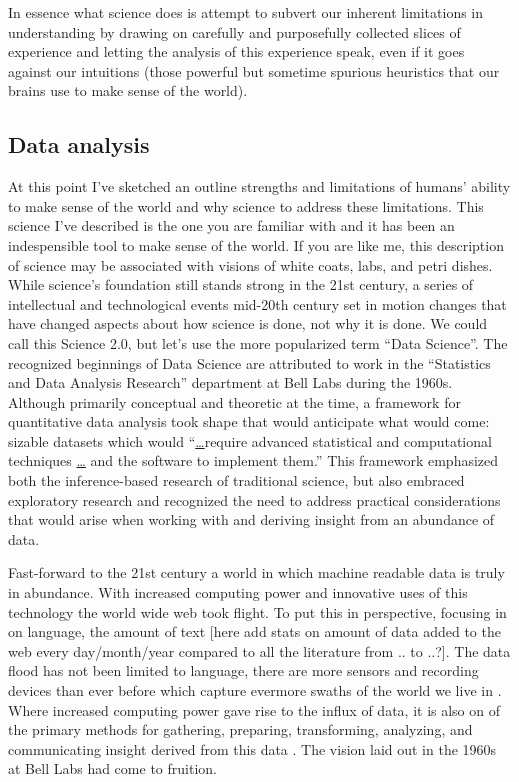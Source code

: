 \documentclass[
]{article}
\begin{document}
In essence what science does is attempt to subvert our inherent limitations in understanding by drawing on carefully and purposefully collected slices of experience and letting the analysis of this experience speak, even if it goes against our intuitions (those powerful but sometime spurious heuristics that our brains use to make sense of the world).

\hypertarget{data-analysis}{%
\subsection{Data analysis}\label{data-analysis}}

At this point I've sketched an outline strengths and limitations of humans' ability to make sense of the world and why science to address these limitations. This science I've described is the one you are familiar with and it has been an indespensible tool to make sense of the world. If you are like me, this description of science may be associated with visions of white coats, labs, and petri dishes. While science's foundation still stands strong in the 21st century, a series of intellectual and technological events mid-20th century set in motion changes that have changed aspects about how science is done, not why it is done. We could call this Science 2.0, but let's use the more popularized term ``Data Science''. The recognized beginnings of Data Science are attributed to work in the ``Statistics and Data Analysis Research'' department at Bell Labs during the 1960s. Although primarily conceptual and theoretic at the time, a framework for quantitative data analysis took shape that would anticipate what would come: sizable datasets which would ``\protect\hyperlink{section-6}{\ldots{}}require advanced statistical and computational techniques \protect\hyperlink{section-6}{\ldots{}} and the software to implement them.'' \citep{Chambers2020} This framework emphasized both the inference-based research of traditional science, but also embraced exploratory research and recognized the need to address practical considerations that would arise when working with and deriving insight from an abundance of data.

Fast-forward to the 21st century a world in which machine readable data is truly in abundance. With increased computing power and innovative uses of this technology the world wide web took flight. To put this in perspective, focusing in on language, the amount of text {[}here add stats on amount of data added to the web every day/month/year compared to all the literature from .. to ..?{]}. The data flood has not been limited to language, there are more sensors and recording devices than ever before which capture evermore swaths of the world we live in \citep{Desjardins2019}. Where increased computing power gave rise to the influx of data, it is also on of the primary methods for gathering, preparing, transforming, analyzing, and communicating insight derived from this data \citep{Donoho2017}. The vision laid out in the 1960s at Bell Labs had come to fruition.
\end{document}
